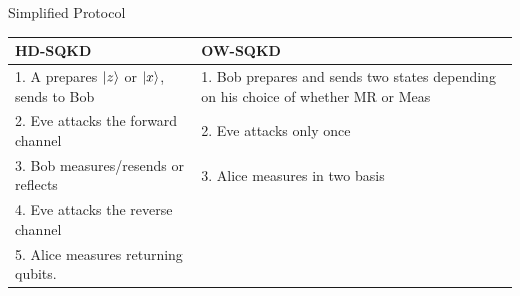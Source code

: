 \documentclass[final]{beamer}
\newlength{\onecolwid}
\newlength{\twocolwid}
\begin{document}
\begin{frame}[t]
\begin{columns}[t]
\begin{column}{\twocolwid}

\begin{columns}[t,totalwidth=\twocolwid] %

\begin{column}{\onecolwid} %


\begin{block}{Simplified Protocol}



      \begin{tabular}{|p{14cm}|p{14cm}|}
      	\hline 
      	\textbf{HD-SQKD} & \textbf{OW-SQKD}\\
      	\hline \hline
      	1. A prepares $\ket{z}$ or $\ket{x}$, sends to Bob  & 1. Bob prepares and sends two states depending on his choice of whether MR or Meas\\ \hline
      	2. Eve attacks the forward channel  & 2. Eve attacks only once\\ \hline
      	3. Bob measures/resends or reflects & 3. Alice measures in two basis \\ \hline
      	4. Eve attacks the reverse channel & \\ \cline{1-1}
		5. Alice measures returning qubits. & \\
      	\hline
      \end{tabular}



\end{block}


\end{column}
\end{columns}
\end{column}
\end{columns}
\end{frame}
\end{document}
